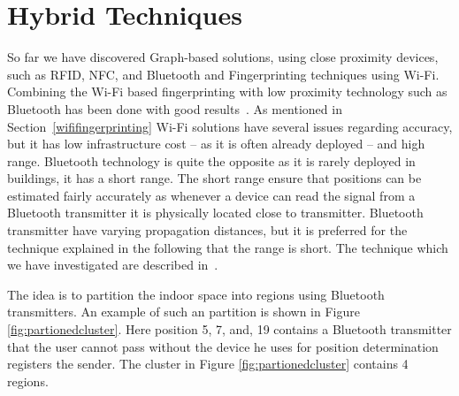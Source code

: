 \section{Hybrid Techniques}
So far we have discovered Graph-based solutions, using close proximity devices, such as RFID, NFC, and Bluetooth and Fingerprinting techniques using Wi-Fi. 
Combining the Wi-Fi based fingerprinting with low proximity technology such as Bluetooth has been done with good results~\cite{6068444}.
As mentioned in Section~\ref{wififingerprinting} Wi-Fi solutions have several issues regarding accuracy, but it has low infrastructure cost -- as it is often already deployed -- and high range. 
Bluetooth technology is quite the opposite as it is rarely deployed in buildings, it has a short range. 
The short range ensure that positions can be estimated fairly accurately as whenever a device can read the signal from a Bluetooth transmitter it is physically located close to transmitter. 
Bluetooth transmitter have varying propagation distances, but it is preferred for the technique explained in the following that the range is short. 
The technique which we have investigated are described in~\cite{6068444}.

The idea is to partition the indoor space into regions using Bluetooth transmitters.
An example of such an partition is shown in Figure \ref{fig:partionedcluster}. 
Here position 5, 7, and, 19 contains a Bluetooth transmitter that the user cannot pass without the device he uses for position determination registers the sender.  
The cluster in Figure \ref{fig:partionedcluster} contains 4 regions. 

